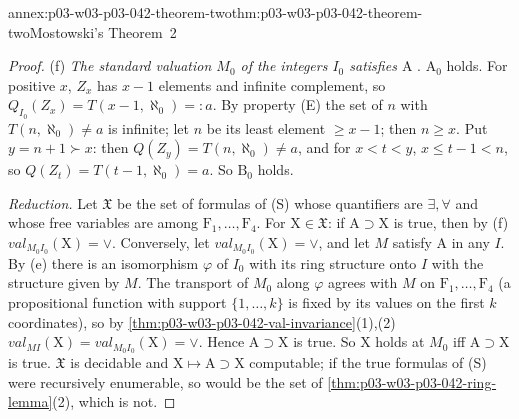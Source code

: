 \begin{annexitem}{annex:p03-w03-p03-042-theorem-two}{thm:p03-w03-p03-042-theorem-two}{Mostowski's Theorem~2}
\begin{proof}
(f) \emph{The standard valuation \(M_0\) of the integers \(I_0\)
satisfies \(\mathrm A\)} \cite[p.~19]{Mostowski1957}.  \(\mathrm A_0\)
holds.  For positive \(x\), \(Z_x\) has \(x-1\) elements and infinite
complement, so \(Q_{I_0}(Z_x)=T(x-1,\aleph_0)=:a\).  By property (E) the
set of \(n\) with \(T(n,\aleph_0)\neq a\) is infinite; let \(n\) be its
least element \(\geq x-1\); then \(n\geq x\).  Put \(y=n+1\succ x\): then
\(Q(Z_y)=T(n,\aleph_0)\neq a\), and for \(x<t<y\), \(x\le t-1<n\), so
\(Q(Z_t)=T(t-1,\aleph_0)=a\).  So \(\mathrm B_0\) holds.

\emph{Reduction.}  Let \(\mathfrak X\) be the set of formulas of (S)
whose quantifiers are \(\exists,\forall\) and whose free variables are
among \(\mathrm F_1,\ldots,\mathrm F_4\).  For \(\mathrm X\in\mathfrak X\):
if \(\mathrm A\supset\mathrm X\) is true, then by (f)
\(\mathit{val}_{M_0I_0}(\mathrm X)=\vee\).  Conversely, let
\(\mathit{val}_{M_0I_0}(\mathrm X)=\vee\), and let \(M\) satisfy
\(\mathrm A\) in any \(I\).  By (e) there is an isomorphism \(\varphi\) of
\(I_0\) with its ring structure onto \(I\) with the structure given by
\(M\).  The transport of \(M_0\) along \(\varphi\) agrees with \(M\) on
\(\mathrm F_1,\ldots,\mathrm F_4\) (a propositional function with support
\(\{1,\ldots,k\}\) is fixed by its values on the first \(k\) coordinates),
so by \cref{thm:p03-w03-p03-042-val-invariance}(1),(2)
\(\mathit{val}_{MI}(\mathrm X)=\mathit{val}_{M_0I_0}(\mathrm X)=\vee\).
Hence \(\mathrm A\supset\mathrm X\) is true.  So \(\mathrm X\) holds at
\(M_0\) iff \(\mathrm A\supset\mathrm X\) is true.  \(\mathfrak X\) is
decidable and \(\mathrm X\mapsto\mathrm A\supset\mathrm X\) computable; if
the true formulas of (S) were recursively enumerable, so would be the set
of \cref{thm:p03-w03-p03-042-ring-lemma}(2), which is not.
\end{proof}
\end{annexitem}

